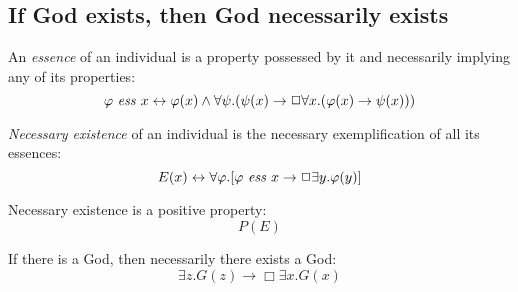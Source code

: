 \documentclass{llncs}
\newcommand{\imp}{\rightarrow}
\newcommand{\biimp}{\leftrightarrow}
\newcommand{\all}{\forall}
\newcommand{\ex}{\exists}
\newcommand{\nec}{\Box} %
\begin{document}
\subsection{If God exists, then God necessarily exists}

\begin{definition}
\label{D2}
An \emph{essence} of an individual is a property possessed by it and necessarily implying any of its properties:
$$
\ess{\varphi}{x} \biimp \varphi(x) \wedge \all \psi. (\psi(x) \imp \nec \all x. (\varphi(x) \imp \psi(x)))
$$
\end{definition}


\begin{definition}
\label{D3}
\emph{Necessary existence} of an individual is the necessary exemplification of all its essences:
$$
E(x) \biimp \all \varphi.[\ess{\varphi}{x} \imp \nec \ex y.\varphi(y)]
$$
\end{definition}
\begin{axiom}
\label{A5}
Necessary existence is a positive property:
$$
P(E)
$$
\end{axiom}
\begin{lemma}
\label{L1}
If there is a God, then necessarily there exists a God:
$$
\ex z. G(z) \imp \nec \ex x. G(x)
$$
\end{lemma}
\end{document}
